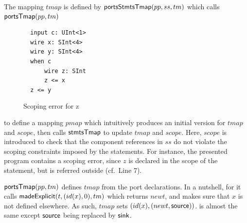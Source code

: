 
The mapping $tmap$ is defined by ${\sf portsStmtsTmap}(pp, ss, tm)$ which calls ${\sf portsTmap}(pp, tm)$ %
\begin{figure}
\centering
\begin{minipage}{0.25\textwidth}
\begin{lstlisting}
  input c: UInt<1>
  wire x: SInt<4>
  wire y: SInt<4>
  when c
      wire z: SInt
      z <= x
  z <= y
\end{lstlisting}
\end{minipage}
\vspace*{-3mm}\caption{Scoping error for  {\small\ttfamily z}}
\label{fig:example}
\end{figure}
to define a mapping $pmap$ which  intuitively produces an initial version for $tmap$ and $scope$, then calls ${\sf stmtsTmap}$ %
to update $tmap$ and $scope$. %
%
Here, $scope$ is introduced to check that the component references in $ss$ do not violate  the scoping constraints
imposed by the  statements. For instance, the presented {\hifirrtl} program contains a scoping error, since $z$ is declared in the scope of the  statement, but is referred outside  (cf.\ Line 7).
%

${\sf portsTmap}(pp, tm)$ defines $tmap$ from the port declarations. In a nutshell, for  it calls ${\sf madeExplicit}(t, (id(x), 0), tm)$ which returns $newt$, and makes sure that $x$ is not defined elsewhere. %
As such, $tmap$ sets %
$(id(x), (newt, {\sf source}))$. %
 is almost the same %
except ${\sf source}$ being replaced by ${\sf sink}$.

